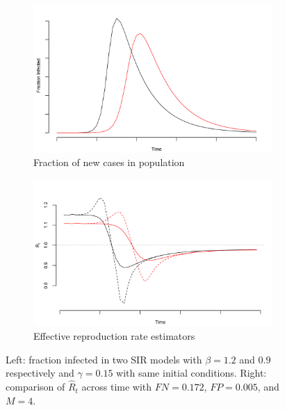 \documentclass[12pt]{article}
\begin{document}
\begin{figure}[!th]
\centering
\begin{subfigure}{.5\textwidth}
  \centering
  \includegraphics[width=.9\linewidth]{../methods/figs/sir.png}
  \caption{Fraction of new cases in population}
  \label{fig:fracpop}
\end{subfigure}%
\begin{subfigure}{.5\textwidth}
  \centering
  \includegraphics[width=.9\linewidth]{../methods/figs/sir_rt_comparison.png}
  \caption{Effective reproduction rate estimators}
  \label{fig:eff}
\end{subfigure}
\caption{Left: fraction infected in two SIR models with $\beta = 1.2$ and $0.9$ respectively and $\gamma = 0.15$ with same initial conditions. Right: comparison of $\hat R_t$ across time with $FN = 0.172$, $FP = 0.005$, and $M = 4$.}
\label{fig:comparison}
\end{figure}
\end{document}
